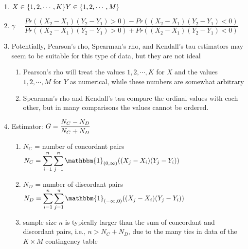 \begin{enumerate}
    \item[] $
        \hfill
        X \in \{1, 2,\cdots, K\}
        \hfill
        Y \in \{1, 2,\cdots, M\}
        \hfill
    $

    \vspace{0.2cm}
    \item[] $
        \gamma
        = \dfrac{
            Pr((X_2 - X_1)(Y_2 - Y_1) > 0) - Pr((X_2 - X_1)(Y_2 - Y_1) < 0)
        }{
            Pr((X_2 - X_1)(Y_2 - Y_1) > 0) + Pr((X_2 - X_1)(Y_2 - Y_1) < 0)
        }
    $

    \vspace{0.2cm}
    \item Potentially, Pearson’s rho, Spearman’s rho, and Kendall’s tau estimators may seem to be suitable for this type of data, but they are not ideal

    \begin{enumerate}
        \item Pearson’s rho will treat the values $1, 2, \cdots, K$ for $X$ and the values $1, 2, \cdots, M$ for $Y$ as numerical, while these numbers are somewhat arbitrary

        \item Spearman’s rho and Kendall’s tau compare the ordinal values with each other, but in many comparisons the values cannot be ordered.
    \end{enumerate}

    \item Estimator: $
        \hfill
        G = \dfrac{N_C - N_D}{N_C + N_D}
        \hfill
    $

    \begin{enumerate}
        \item $N_C$ 
        = number of concordant pairs 
        \hfill
        $
            N_C
            =\dsum_{i=1}^n \dsum_{j=1}^n
            \mathbbm{1}_{(0,\infty)} ((X_j - X_i)(Y_j - Y_i))
        $
        \hfill
    
        \item $N_D$ 
        = number of discordant pairs 
        \hfill
        $
            N_D
            =\dsum_{i=1}^n \dsum_{j=1}^n
            \mathbbm{1}_{(-\infty,0)} ((X_j - X_i)(Y_j - Y_i))
        $
        \hfill
    
        \item sample size $n$ is typically larger than the sum of concordant and discordant pairs, i.e., $n > N_C + N_D$, due to the many ties in data of the $K \times M$ contingency table
    \end{enumerate}


\end{enumerate}
